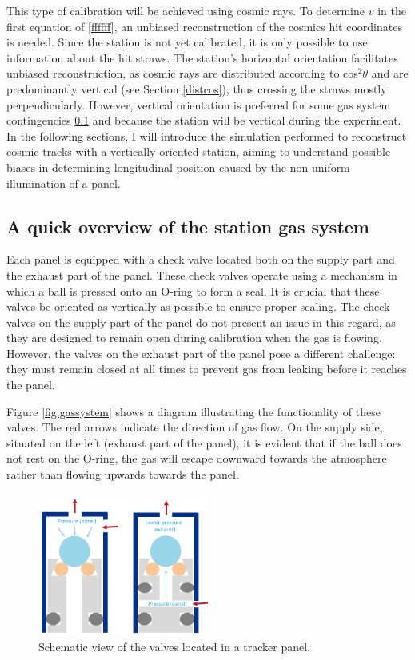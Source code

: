 This type of calibration will be achieved using cosmic rays. 
To determine $v$ in the first equation of \ref{ffffff}, 
an unbiased reconstruction of the cosmics hit coordinates is needed.
Since the station is not yet calibrated, it is only possible 
to use information about the hit straws. 
The station's horizontal orientation facilitates unbiased 
reconstruction, as cosmic rays are distributed according to 
cos$^2\theta$ and are predominantly vertical (see Section \ref{distcos}), 
thus crossing the straws mostly perpendicularly.
However, vertical orientation is preferred for some gas system contingencies 
\ref{gassystem} and because the station will 
be vertical during the experiment. 
In the following sections, I will introduce the simulation performed to reconstruct cosmic tracks with 
a vertically oriented station, aiming to understand possible biases in determining longitudinal position caused by the non-uniform illumination of a panel.
\subsection{A quick overview of the station gas system}\label{gassystem}
Each panel is equipped with a check valve located both on the supply part and the exhaust 
part of the panel. These check valves operate using a mechanism in which a ball is pressed onto an 
O-ring to form a seal. It is crucial that these valves be oriented as vertically as possible to ensure proper sealing. 
The check valves on the supply part of the panel do not present an issue in this regard, as they are designed 
to remain open during calibration when the gas is flowing. However, the valves on the exhaust part of 
the panel pose a different challenge: they must remain closed at all times to prevent gas from 
leaking before it reaches the panel.

Figure \ref{fig:gassystem} shows a diagram illustrating the functionality of these valves. 
The red arrows indicate the direction of gas flow. On the supply side, situated on the left 
(exhaust part of the panel), it is evident that if the ball does not rest on the O-ring, 
the gas will escape downward towards the atmosphere rather than flowing upwards towards the panel.

\begin{figure}[!h]
    \centering
    \includegraphics[width =0.5\textwidth]{figures/png/gassystem.png}
    \caption[Schematic view of the valves located in a tracker panel.]{Schematic view of the valves located in a tracker panel.}
    \label{fig:gassytem}
\end{figure}


